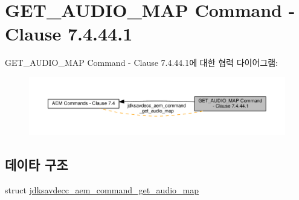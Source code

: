\hypertarget{group__command__get__audio__map}{}\section{G\+E\+T\+\_\+\+A\+U\+D\+I\+O\+\_\+\+M\+AP Command -\/ Clause 7.4.44.1}
\label{group__command__get__audio__map}
G\+E\+T\+\_\+\+A\+U\+D\+I\+O\+\_\+\+M\+AP Command -\/ Clause 7.4.44.1에 대한 협력 다이어그램\+:
\nopagebreak
\begin{figure}[H]
\begin{center}
\leavevmode
\includegraphics[width=350pt]{group__command__get__audio__map}
\end{center}
\end{figure}
\subsection*{데이타 구조}
\begin{DoxyCompactItemize}
\item 
struct \hyperlink{structjdksavdecc__aem__command__get__audio__map}{jdksavdecc\+\_\+aem\+\_\+command\+\_\+get\+\_\+audio\+\_\+map}
\end{DoxyCompactItemize}
